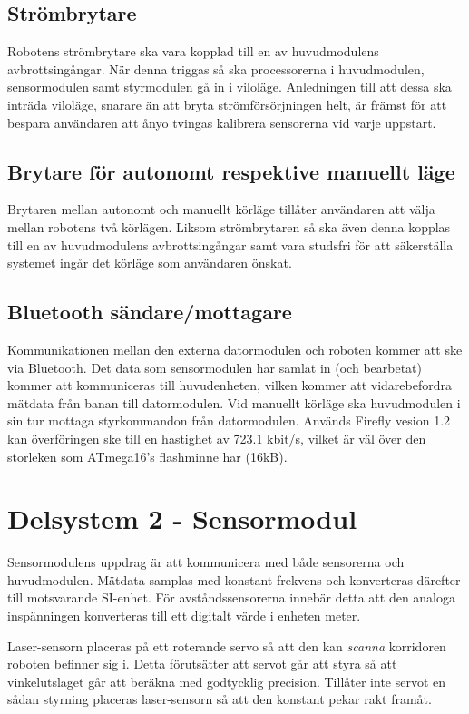 \documentclass[11pt]{article}
\begin{document}
\begin{flushleft}
\subsection{Strömbrytare}
Robotens strömbrytare ska vara kopplad till en av huvudmodulens avbrottsingångar. När denna triggas så ska processorerna i huvudmodulen, sensormodulen samt styrmodulen gå in i viloläge. Anledningen till att dessa ska inträda viloläge, snarare än att bryta strömförsörjningen helt, är främst för att bespara användaren att ånyo tvingas kalibrera sensorerna vid varje uppstart.
\subsection{Brytare för autonomt respektive manuellt läge}
Brytaren mellan autonomt och manuellt körläge tillåter användaren att välja mellan robotens två körlägen. Liksom strömbrytaren så ska även denna kopplas till en av huvudmodulens avbrottsingångar samt vara studsfri för att säkerställa systemet ingår det körläge som användaren önskat.
\subsection{Bluetooth\textsuperscript{\circledR} sändare/mottagare}
Kommunikationen mellan den externa datormodulen och roboten kommer att ske via Bluetooth\textsuperscript{\circledR}. Det data som sensormodulen har samlat in (och bearbetat) kommer att kommuniceras till huvudenheten, vilken kommer att vidarebefordra mätdata från banan till datormodulen. Vid manuellt körläge ska huvudmodulen i sin tur mottaga styrkommandon från datormodulen. Används Firefly vesion 1.2 kan överföringen ske till en hastighet av 723.1 kbit/s, vilket är väl över den storleken som ATmega16's flashminne har (16kB).

\pagebreak
\section{Delsystem 2 - Sensormodul}
\label{sec:sensormodul}
Sensormodulens uppdrag är att kommunicera med både sensorerna och huvudmodulen. Mätdata samplas med konstant frekvens och konverteras därefter till motsvarande SI-enhet. För avståndssensorerna innebär detta att den analoga inspänningen konverteras till ett digitalt värde i enheten meter.

Laser-sensorn placeras på ett roterande servo så att den kan \emph{scanna} korridoren roboten befinner sig i. Detta förutsätter att servot går att styra så att vinkelutslaget går att beräkna med godtycklig precision. Tillåter inte servot en sådan styrning placeras laser-sensorn så att den konstant pekar rakt framåt.


\end{flushleft}
\end{document}
